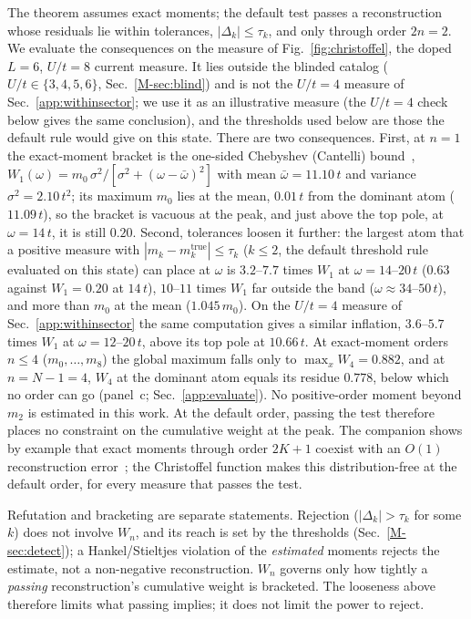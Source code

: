 \documentclass[aps,prb,onecolumn,superscriptaddress,longbibliography,floatfix]{revtex4-2}
\begin{document}
The theorem assumes exact moments; the default test passes a reconstruction whose residuals lie within tolerances, $|\Delta_k|\le\tau_k$, and only through order $2n=2$. We evaluate the consequences on the measure of Fig.~\ref{fig:christoffel}, the doped $L=6$, $U/t=8$ current measure. It lies outside the blinded catalog ($U/t\in\{3,4,5,6\}$, Sec.~\ref{M-sec:blind}) and is not the $U/t=4$ measure of Sec.~\ref{app:withinsector}; we use it as an illustrative measure (the $U/t=4$ check below gives the same conclusion), and the thresholds used below are those the default rule would give on this state. There are two consequences. First, at $n=1$ the exact-moment bracket is the one-sided Chebyshev (Cantelli) bound~\cite{KarlinStudden1966}, $W_1(\omega)=m_0\,\sigma^2/[\sigma^2+(\omega-\bar\omega)^2]$ with mean $\bar\omega=11.10\,t$ and variance $\sigma^2=2.10\,t^2$; its maximum $m_0$ lies at the mean, $0.01\,t$ from the dominant atom ($11.09\,t$), so the bracket is vacuous at the peak, and just above the top pole, at $\omega=14\,t$, it is still $0.20$. Second, tolerances loosen it further: the largest atom that a positive measure with $|m_k-m_k^{\mathrm{true}}|\le\tau_k$ ($k\le2$, the default threshold rule evaluated on this state) can place at $\omega$ is $3.2$--$7.7$ times $W_1$ at $\omega=14$--$20\,t$ ($0.63$ against $W_1=0.20$ at $14\,t$), $10$--$11$ times $W_1$ far outside the band ($\omega\approx34$--$50\,t$), and more than $m_0$ at the mean ($1.045\,m_0$). On the $U/t=4$ measure of Sec.~\ref{app:withinsector} the same computation gives a similar inflation, $3.6$--$5.7$ times $W_1$ at $\omega=12$--$20\,t$, above its top pole at $10.66\,t$. At exact-moment orders $n\le4$ ($m_0,\dots,m_8$) the global maximum falls only to $\max_xW_4=0.882$, and at $n=N-1=4$, $W_4$ at the dominant atom equals its residue $0.778$, below which no order can go (panel~c; Sec.~\ref{app:evaluate}). No positive-order moment beyond $m_2$ is estimated in this work. At the default order, passing the test therefore places no constraint on the cumulative weight at the peak. The companion shows by example that exact moments through order $2K+1$ coexist with an $O(1)$ reconstruction error~\cite{SQDspec2608}; the Christoffel function makes this distribution-free at the default order, for every measure that passes the test.

Refutation and bracketing are separate statements. Rejection ($|\Delta_k|>\tau_k$ for some $k$) does not involve $W_n$, and its reach is set by the thresholds (Sec.~\ref{M-sec:detect}); a Hankel/Stieltjes violation of the \emph{estimated} moments rejects the estimate, not a non-negative reconstruction. $W_n$ governs only how tightly a \emph{passing} reconstruction's cumulative weight is bracketed. The looseness above therefore limits what passing implies; it does not limit the power to reject.
\end{document}
